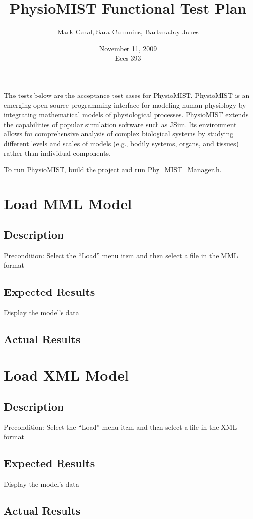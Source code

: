 \documentclass{article}
\title{PhysioMIST Functional Test Plan}
\author{Mark Caral, Sara Cummins, BarbaraJoy Jones}
\date{November 11, 2009\\{\sc Eecs} 393}
\begin{document}
\begin{titlepage}
\maketitle\thispagestyle{empty}
\end{titlepage}

The tests below are the acceptance test cases for PhysioMIST.
PhysioMIST is an emerging open source programming interface for modeling human physiology by integrating mathematical models of physiological processes.
PhysioMIST extends the capabilities of popular simulation software such as JSim.
Its environment allows for comprehensive analysis of complex biological systems by studying different levels and scales of models (e.g., bodily systems, organs, and tissues) rather than individual components.

To run PhysioMIST, build the project and run Phy\_MIST\_Manager.h.

\section{Load MML Model}
\subsection{Description}
Precondition: Select the ``Load'' menu item and then select a file in the MML format
\subsection{Expected Results}
Display the model's data
\subsection{Actual Results}

\section{Load XML Model}
\subsection{Description}
Precondition: Select the ``Load'' menu item and then select a file in the XML format
\subsection{Expected Results}
Display the model's data
\subsection{Actual Results}
\end{document}
